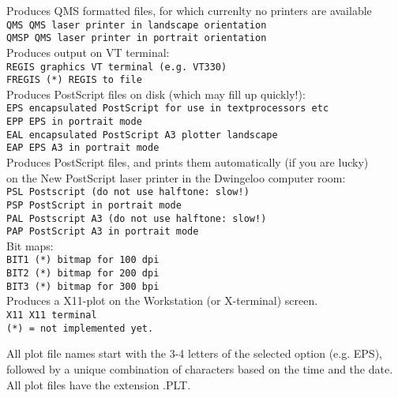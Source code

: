 
Produces QMS formatted files, for which currenlty no printers are available\\ 
{\tt  QMS    QMS laser printer in landscape orientation}\\ 
{\tt  QMSP   QMS laser printer in portrait orientation}\\ 
Produces output on VT terminal:\\ 
{\tt  REGIS  graphics VT terminal (e.g. VT330)}\\ 
{\tt  FREGIS (*) REGIS to file}\\ 
Produces PostScript files on disk (which may fill up quickly!):\\ 
{\tt  EPS    encapsulated PostScript for use in textprocessors etc}\\ 
{\tt  EPP    EPS in portrait mode}\\ 
{\tt  EAL    encapsulated PostScript A3 plotter landscape}\\ 
{\tt  EAP    EPS A3 in portrait mode}\\ 
Produces PostScript files, and prints them automatically (if you are lucky)\\ 
on the New PostScript laser printer in the Dwingeloo computer room:\\ 
{\tt  PSL    Postscript (do not use halftone: slow!)}\\ 
{\tt  PSP    PostScript in portrait mode}\\ 
{\tt  PAL    Postscript A3 (do not use halftone: slow!)}\\ 
{\tt  PAP    PostScript A3 in portrait mode}\\ 
Bit maps:\\ 
{\tt  BIT1   (*) bitmap for 100 dpi}\\ 
{\tt  BIT2   (*) bitmap for 200 dpi}\\ 
{\tt  BIT3   (*) bitmap for 300 bpi}\\ 
Produces a X11-plot on the Workstation (or X-terminal) screen.\\ 
{\tt  X11    X11 terminal}\\ 

{\tt (*) = not implemented yet.} 

All plot file names start with the 3-4 letters of the selected option (e.g.
EPS), followed by a unique combination of characters based on the time and the
date. All plot files have the extension .PLT. 

